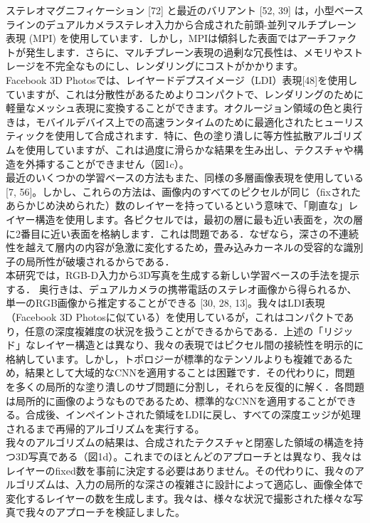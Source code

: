 \documentclass[a4paper,10pt,titlepage]{jsarticle}
\begin{document}
ステレオマグニフィケーション [72] と最近のバリアント [52, 39] は，小型ベースラインのデュアルカメラステレオ入力から合成された前頭-並列マルチプレーン表現 (MPI) を使用しています．しかし，MPIは傾斜した表面ではアーチファクトが発生します．さらに、マルチプレーン表現の過剰な冗長性は、メモリやストレージを不完全なものにし、レンダリングにコストがかかります。\\

Facebook 3D Photosでは、レイヤードデプスイメージ（LDI）表現[48]を使用していますが、これは分散性があるためよりコンパクトで、レンダリングのために軽量なメッシュ表現に変換することができます。オクルージョン領域の色と奥行きは，モバイルデバイス上での高速ランタイムのために最適化されたヒューリスティックを使用して合成されます．特に、色の塗り潰しに等方性拡散アルゴリズムを使用していますが、これは過度に滑らかな結果を生み出し、テクスチャや構造を外挿することができません（図1c）。\\

最近のいくつかの学習ベースの方法もまた、同様の多層画像表現を使用している[7, 56]。しかし、これらの方法は、画像内のすべてのピクセルが同じ（ﬁxされたあらかじめ決められた）数のレイヤーを持っているという意味で、「剛直な」レイヤー構造を使用します。各ピクセルでは，最初の層に最も近い表面を，次の層に2番目に近い表面を格納します．これは問題である．なぜなら，深さの不連続性を越えて層内の内容が急激に変化するため，畳み込みカーネルの受容的な識別子の局所性が破壊されるからである．\\

本研究では，RGB-D入力から3D写真を生成する新しい学習ベースの手法を提示する．
 奥行きは、デュアルカメラの携帯電話のステレオ画像から得られるか、単一のRGB画像から推定することができる [30, 28, 13]。我々はLDI表現（Facebook 3D Photosに似ている）を使用しているが，これはコンパクトであり，任意の深度複雑度の状況を扱うことができるからである．上述の「リジッド」なレイヤー構造とは異なり、我々の表現ではピクセル間の接続性を明示的に格納しています。しかし，トポロジーが標準的なテンソルよりも複雑であるため，結果として大域的なCNNを適用することは困難です．その代わりに，問題を多くの局所的な塗り潰しのサブ問題に分割し，それらを反復的に解く．各問題は局所的に画像のようなものであるため、標準的なCNNを適用することができる。合成後、インペイントされた領域をLDIに戻し、すべての深度エッジが処理されるまで再帰的アルゴリズムを実行する。\\

我々のアルゴリズムの結果は、合成されたテクスチャと閉塞した領域の構造を持つ3D写真である（図1d）。これまでのほとんどのアプローチとは異なり、我々はレイヤーのﬁxed数を事前に決定する必要はありません。その代わりに、我々のアルゴリズムは、入力の局所的な深さの複雑さに設計によって適応し、画像全体で変化するレイヤーの数を生成します。我々は、様々な状況で撮影された様々な写真で我々のアプローチを検証しました。\\
\end{document}
